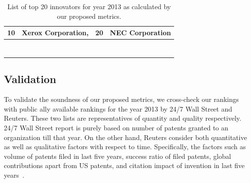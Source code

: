 \begin{table}[h]
\begin{tabular}{clcl}
\multicolumn{1}{|c|}{10}            & \multicolumn{1}{l|}{Xerox Corporation,}                          & \multicolumn{1}{c|}{20}            & \multicolumn{1}{l|}{NEC Corporation}                           \\ \hline
\multicolumn{1}{l}{}                &                                                                  & \multicolumn{1}{l}{}               &                                                                \\
\multicolumn{1}{l}{}                &                                                                  & \multicolumn{1}{l}{}               &                                                                \\
\multicolumn{1}{l}{}                &                                                                  & \multicolumn{1}{l}{}               &                                                                \\
\multicolumn{1}{l}{}                &                                                                  & \multicolumn{1}{l}{}               &                                                                \\
\multicolumn{1}{l}{}                &                                                                  & \multicolumn{1}{l}{}               &                                                                \\
\multicolumn{1}{l}{}                &                                                                  & \multicolumn{1}{l}{}               &                                                                \\
\multicolumn{1}{l}{}                &                                                                  & \multicolumn{1}{l}{}               &                                                               
\end{tabular}
\caption{List of top 20 innovators for year 2013 as calculated by our proposed metrics.}
\label{lst:top20}
\end{table}


\subsection{Validation}

To validate the soundness of our proposed metrics, we cross-check our rankings
with public ally available rankings for the year 2013 by 24/7 Wall Street and
Reuters. These two lists are representatives of quantity and quality
respectively.  24/7 Wall Street report is purely based on number of patents
granted to an organization till that year.  On the other hand, Reuters
consider both quantitative as well as qualitative factors with respect to
time. Specifically, the factors such as volume of patents filed in last five
years, success ratio of filed patents, global contributions apart from US
patents, and citation impact of invention in last five years~\cite{reuters-method}.

